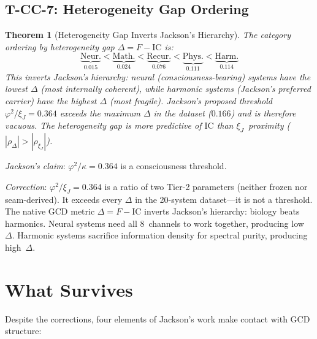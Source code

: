 \documentclass[
  aps,
  prd,
  twocolumn,
  superscriptaddress,
  nofootinbib,
  floatfix
]{revtex4-2}
\newtheorem{theorem}{Theorem}
\newcommand{\beq}{\begin{equation}}
\newcommand{\eeq}{\end{equation}}
\newcommand{\IC}{\mathrm{IC}}
\newcommand{\xiJ}{\xi_J}
\begin{document}
\subsection{T-CC-7: Heterogeneity Gap Ordering}

\begin{theorem}[Heterogeneity Gap Inverts Jackson's Hierarchy]
The category ordering by heterogeneity gap $\Delta = F - \IC$ is:
\beq
  \underbrace{\text{Neur.}}_{0.015} <
  \underbrace{\text{Math.}}_{0.024} <
  \underbrace{\text{Recur.}}_{0.076} <
  \underbrace{\text{Phys.}}_{0.111} <
  \underbrace{\text{Harm.}}_{0.114}
\eeq
This inverts Jackson's hierarchy: neural (consciousness-bearing) systems
have the lowest $\Delta$ (most internally coherent), while harmonic
systems (Jackson's preferred carrier) have the highest $\Delta$ (most
fragile).  Jackson's proposed threshold $\varphi^2/\xiJ = 0.364$ exceeds
the maximum $\Delta$ in the dataset ($0.166$) and is therefore vacuous.
The heterogeneity gap is more predictive of $\IC$ than $\xiJ$~proximity
($|\rho_{\Delta}| > |\rho_{\xiJ}|$).
\end{theorem}

\emph{Jackson's claim}: $\varphi^2/\kappa = 0.364$ is a consciousness
threshold.

\emph{Correction}: $\varphi^2/\xiJ = 0.364$ is a ratio of two Tier-2
parameters (neither frozen nor seam-derived).  It exceeds every $\Delta$
in the 20-system dataset---it is not a threshold.  The native GCD metric
$\Delta = F - \IC$ inverts Jackson's hierarchy: biology beats harmonics.
Neural systems need all 8~channels to work together, producing low~$\Delta$.
Harmonic systems sacrifice information density for spectral purity,
producing high~$\Delta$.

\section{What Survives}
\label{sec:survives}

Despite the corrections, four elements of Jackson's work make contact
with GCD structure:
\end{document}
